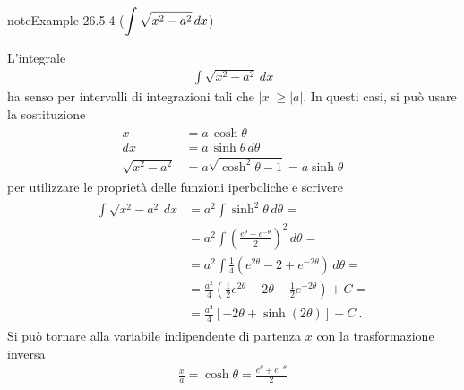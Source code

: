 \documentclass[letterpaper,10pt,italian]{jupyterBook}
\begin{document}
\begin{sphinxadmonition}{note}{Example 26.5.4 (\protect\(\displaystyle \int \sqrt{x^2 - a^2} \,  dx\protect\))}



\sphinxAtStartPar
L’integrale
\begin{equation*}
\begin{split}\int \sqrt{x^2 - a^2} \,  dx\end{split}
\end{equation*}
\sphinxAtStartPar
ha senso per intervalli di integrazioni tali che \(|x| \ge |a|\). In questi casi, si può usare la sostituzione
\begin{equation*}
\begin{split}\begin{aligned}
   x & = a \, \cosh \theta \\
  dx & = a \, \sinh \theta \, d \theta \\
  \sqrt{x^2 - a^2} & = a \sqrt{\cosh^2 \theta - 1} = a \sinh \theta
\end{aligned}\end{split}
\end{equation*}
\sphinxAtStartPar
per utilizzare le proprietà delle funzioni iperboliche e scrivere
\begin{equation*}
\begin{split}\begin{aligned}
  \int \sqrt{x^2 - a^2} \, dx
   & = a^2 \int \sinh^2 \theta \, d \theta = \\
   & = a^2 \int \left( \frac{e^\theta - e^{-\theta}}{2} \right)^2 \, d \theta = \\
   & = a^2 \int \frac{1}{4} \left( e^{2 \theta} - 2 + e^{-2 \theta} \right) \, d \theta = \\
   & = \frac{a^2}{4} \left( \frac{1}{2} e^{2 \theta} - 2 \theta - \frac{1}{2} e^{-2 \theta} \right) + C = \\
   & = \frac{a^2}{4} \left[ -2 \theta + \sinh \left( 2 \theta \right) \right] + C \ .
\end{aligned}\end{split}
\end{equation*}
\sphinxAtStartPar
Si può tornare alla variabile indipendente di partenza \(x\) con la trasformazione inversa
\begin{equation*}
\begin{split}\frac{x}{a} = \cosh \theta = \frac{e^{\theta} + e^{-\theta}}{2}\end{split}
\end{equation*}\begin{equation*}

\end{equation*}
\end{sphinxadmonition}
\end{document}
